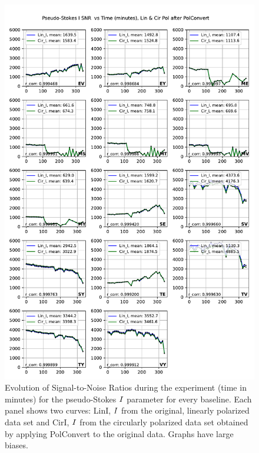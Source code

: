 \documentclass[letterpaper,twoside,12pt]{article}
\begin{document}
\begin{figure}[ht!]
  \begin{center}
  \includegraphics[width=33pc]{SNR_Lin_I_and_Cir_I.pdf}
  \caption{\small Evolution of Signal-to-Noise Ratios during the experiment (time in minutes) for the pseudo-Stokes $\protect I$ parameter for every baseline. Each panel shows two curves: LinI, $\protect I$ from the original, linearly polarized data set and CirI, $\protect I$ from the circularly polarized data set obtained by applying PolConvert to the original data. Graphs have large biases. }
  \label{snr_lin_and_cir}
  \end{center}
\end{figure}
\end{document}
